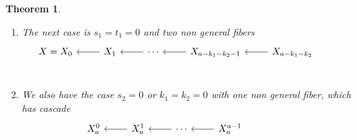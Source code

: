 \documentclass[12pt]{amsbook}
\theoremstyle{plain}
\newtheorem{thm}{Theorem}[section]
\begin{document}
\begin{thm}
\begin{enumerate}
\[\begin{tikzpicture}[baseline= (a).base]
\node[scale=.6] (a) at (0,0){
\begin{tikzcd}
        &               &                  &                                     &                                   &                                           & Y' \arrow[r] \arrow[rd]       & {Y_1^2}' \arrow[r] & \cdots \arrow[r] & {Y_{n_2'}^2}' \\
X = X_0 & X_1 \arrow[l] & \cdots \arrow[l] & X_{a-k_1-k_2-1} \arrow[l] \arrow[d] & X_{a-k_1-k_2} \arrow[l] \arrow[r] & X'_{a'-k_1'-k_2'-1} \arrow[rd] \arrow[ru] &                               & {Y_1^1}'           & \cdots \arrow[r] & {Y_{n_1'}^1}' \\
        &               &                  & Y \arrow[ld] \arrow[rd]             &                                   &                                           & X_{a'-k_1'-k_2'-2}' \arrow[r] & \cdots \arrow[r]   & X'_0             &               \\
        &               & Y_1^1 \arrow[d]  &                                     & Y_1^2 \arrow[d]                   &                                           &                               &                    &                  &               \\
        &               & \vdots \arrow[d] &                                     & \vdots \arrow[d]                  &                                           &                               &                    &                  &               \\
        &               & Y_{n_1}^1        &                                     & Y_{n_2}^2                         &                                           &                               &                    &                  &              
\end{tikzcd}
};
\end{tikzpicture}
\]
\item The next case is $s_1 = t_1 = 0$ and two non general fibers
\[
\begin{tikzcd}
X = X_0 & X_1 \arrow[l] & \cdots \arrow[l] & X_{a-k_1-k_2-1} \arrow[l] & X_{a-k_1-k_2} \arrow[l]  &  \\
\end{tikzcd}
\]
\item We also have the case $s_2 =0$ or $k_1 = k_2 = 0$ with one non general fiber, which has cascade
\[
\begin{tikzcd}
X_a^0 & X_a^1 \arrow[l ]  & \cdots \arrow[l]  & X_a^{a-1}  \arrow[l] &                                                           &                        \\

\end{tikzcd}\]
\end{enumerate}
\end{thm}
\end{document}
